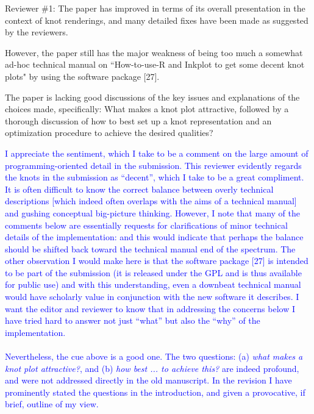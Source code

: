 \documentclass[12pt]{article}
\begin{document}
Reviewer \#1: The paper has improved in terms of its overall
presentation in the context of knot renderings, and many detailed
fixes have been made as suggested by the reviewers.

However, the paper still has the major weakness of being too much a
somewhat ad-hoc technical manual on ``How-to-use-R and Inkplot to get
some decent knot plots" by using the software package [27].


The paper is lacking good discussions of the key issues and
explanations of the choices made, specifically: What makes a knot plot
attractive, followed by a thorough discussion of how to best set up a
knot representation and an optimization procedure to achieve the
desired qualities?

\textcolor{blue}{I appreciate the sentiment, which I take to be a
  comment on the large amount of programming-oriented detail in the
  submission.  This reviewer evidently regards the knots in the
  submission as ``decent'', which I take to be a great compliment.  It
  is often difficult to know the correct balance between overly
  technical descriptions [which indeed often overlaps with the aims of
    a technical manual] and gushing conceptual big-picture thinking.
  However, I note that many of the comments below are essentially
  requests for clarifications of minor technical details of the
  implementation: and this would indicate that perhaps the balance
  should be shifted back toward the technical manual end of the
  spectrum.  The other observation I would make here is that the
  software package [27] is intended to be part of the submission (it
  is released under the GPL and is thus available for public use) and
  with this understanding, even a downbeat technical manual would have
  scholarly value in conjunction with the new software it describes.
  I want the editor and reviewer to know that in addressing the
  concerns below I have tried hard to answer not just ``what'' but
  also the ``why'' of the implementation.  \\ \\ Nevertheless, the cue
  above is a good one.  The two questions: (a) {\em what makes a knot
    plot attractive?}, and (b) {\em how best ... to achieve this?}
  are indeed profound, and were not addressed directly in the old
  manuscript.  In the revision I have prominently stated the questions
  in the introduction, and given a provocative, if brief, outline of
  my view.\\ \\}
\end{document}
